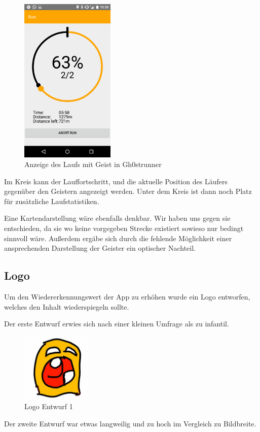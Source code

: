 \begin {figure}[!h]\label{fig:runscreen}
\centering
\includegraphics[width=0.4\textwidth]{abb/bsp/bsp19}
\caption{Anzeige des Laufs mit Geist in Gh0strunner}
\end{figure}

Im Kreis kann der Lauffortschritt, und die aktuelle Position des Läufers gegenüber den Geistern angezeigt werden. Unter dem Kreis ist dann noch Platz für zusätzliche Laufstatistiken. 

Eine Kartendarstellung wäre ebenfalls denkbar. Wir haben uns gegen sie entschieden, da sie wo keine vorgegeben Strecke existiert sowieso nur bedingt sinnvoll wäre. Außerdem ergäbe sich durch die fehlende Möglichkeit einer ansprechenden Darstellung der Geister ein optischer Nachteil.
\subsection{Logo}
Um den Wiedererkennungswert der App zu erhöhen wurde ein Logo entworfen, welches den Inhalt wiederspiegeln sollte.

Der erste Entwurf erwies sich nach einer kleinen Umfrage als zu infantil.

\begin{figure}[!h]
\centering
\includegraphics[width=0.3\textwidth]{abb/icon_entwurf1}
\caption{Logo Entwurf 1}
\end{figure}
Der zweite Entwurf war etwas langweilig und zu hoch im Vergleich zu Bildbreite. 

